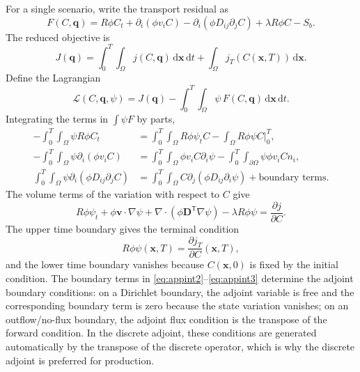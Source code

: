 \documentclass[11pt]{article}
\numberwithin{equation}{section}
\newcommand{\dd}{\,\mathrm{d}}
\newcommand{\pdd}[2]{\frac{\partial #1}{\partial #2}}
\newcommand{\xx}{\mathbf{x}}
\newcommand{\vv}{\mathbf{v}}
\newcommand{\DD}{\mathbf{D}}
\newcommand{\T}{\mathsf{T}}
\theoremstyle{plain}
\begin{document}
For a single scenario, write the transport residual as
\begin{equation}
\label{eq:appF}
F(C,\mathbf{q})
=R\phi C_t+\partial_i(\phi v_iC)
-\partial_i(\phi D_{ij}\partial_jC)
+\lambda R\phi C-S_b.
\end{equation}
The reduced objective is
\begin{equation}
\label{eq:appJ}
J(\mathbf{q})
=\int_0^T\int_\Omega j(C,\mathbf{q})\dd\xx\dd t
+\int_\Omega j_T(C(\xx,T))\dd\xx.
\end{equation}
Define the Lagrangian
\begin{equation}
\label{eq:appL}
\mathcal{L}(C,\mathbf{q},\psi)
=J(\mathbf{q})-\int_0^T\int_\Omega\psi\,F(C,\mathbf{q})\dd\xx\dd t.
\end{equation}
Integrating the terms in $\int\psi F$ by parts,
\begin{align}
-\int_0^T\int_\Omega\psi R\phi C_t
&=\int_0^T\int_\Omega R\phi\psi_tC
-\int_\Omega R\phi\psi C\Big|_{0}^{T},
\label{eq:appint1}\\
-\int_0^T\int_\Omega\psi\partial_i(\phi v_iC)
&=\int_0^T\int_\Omega\phi v_iC\partial_i\psi
-\int_0^T\int_{\partial\Omega}\psi\phi v_iC n_i,
\label{eq:appint2}\\
\int_0^T\int_\Omega\psi\partial_i(\phi D_{ij}\partial_jC)
&=\int_0^T\int_\Omega C\partial_j(\phi D_{ij}\partial_i\psi)
+\text{boundary terms}.
\label{eq:appint3}
\end{align}
The volume terms of the variation with respect to $C$ give
\begin{equation}
\label{eq:appadj}
R\phi\psi_t+\phi\vv\cdot\nabla\psi
+\nabla\cdot(\phi\DD^{\T}\nabla\psi)
-\lambda R\phi\psi
=\pdd{j}{C}.
\end{equation}
The upper time boundary gives the terminal condition
\begin{equation}
\label{eq:appterm}
R\phi\psi(\xx,T)=\pdd{j_T}{C}(\xx,T),
\end{equation}
and the lower time boundary vanishes because $C(\xx,0)$ is fixed by the
initial condition.  The boundary terms in
\eqref{eq:appint2}--\eqref{eq:appint3} determine the adjoint boundary
conditions: on a Dirichlet boundary, the adjoint variable is free and the
corresponding boundary term is zero because the state variation vanishes; on
an outflow/no-flux boundary, the adjoint flux condition is the transpose of
the forward condition.  In the discrete adjoint, these conditions are
generated automatically by the transpose of the discrete operator, which is
why the discrete adjoint is preferred for production.
\end{document}
